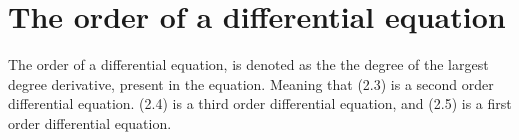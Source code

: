 \section{The order of a differential equation}
The order of a differential equation, is denoted as the the degree of the largest degree derivative, present in the equation. Meaning that (2.3) is a second order differential equation. (2.4) is a third order differential equation, and (2.5) is a first order differential equation.